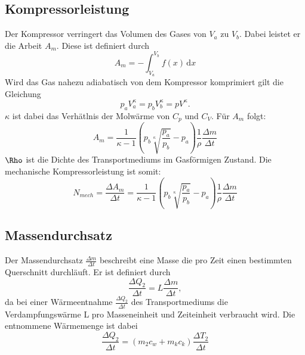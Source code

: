 \subsection{Kompressorleistung}
Der Kompressor verringert das Volumen des Gases von $V_a$ zu $V_b$. Dabei leistet
er die Arbeit $A_m$. Diese ist definiert durch
\begin{equation}
  A_m = - \int_{V_a}^{V_b} f(x) \, \mathrm{d}x
\end{equation}
Wird das Gas nahezu adiabatisch von dem Kompressor komprimiert gilt die Gleichung
\begin{equation}
  p_a V_a^\kappa = p_b V_b^\kappa = pV^\kappa.
\end{equation}
$\kappa$ ist dabei das Verhätlnis der Molwärme von $C_p$ und $C_V$.
Für $A_m$ folgt:
\begin{equation}
  A_m = \frac{1}{\kappa -1}(p_b\sqrt[\kappa]{\frac{p_a}{p_b}}-p_a)\frac{1}{\rho}\frac{\Delta m}{\Delta t}
\end{equation}
$\Rho$ ist die Dichte des Transportmediums im Gasförmigen Zustand. Die mechanische Kompressorleistung
ist somit:
\begin{equation}
  N_{mech} = \frac{\Delta A_m}{\Delta t} = \frac{1}{\kappa -1} (p_b \sqrt[\kappa]{\frac{p_a}{p_b}}-p_a)\frac{1}{\rho}\frac{\Delta m}{\Delta t}
\end{equation}
\subsection{Massendurchsatz}
Der Massendurchsatz $\frac{\Delta m}{\Delta t}$ beschreibt eine Masse die pro Zeit einen bestimmten Querschnitt durchläuft.
Er ist definiert durch
\begin{equation}
  \frac{\Delta Q_2}{\Delta t} = L\frac{\Delta m}{\Delta t} ,
\end{equation}
da bei einer Wärmeentnahme $\frac{\Delta Q_2}{\Delta t}$ des Transportmediums die Verdampfungswärme L pro Masseneinheit und Zeiteinheit
verbraucht wird. Die entnommene Wärmemenge ist dabei
\begin{equation}
  \frac{\Delta Q_2}{\Delta t} = (m_2c_w + m_kc_k)\frac{\Delta T_2}{\Delta t}
\end{equation}
\label{sec:Theorie}
